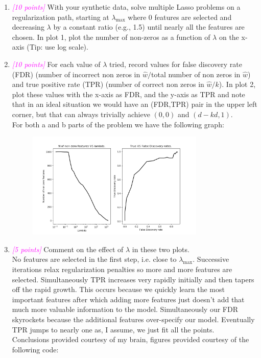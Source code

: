 \documentclass{article}
\newcommand{\1}{\mathbf{1}}
\newcommand{\points}[1]{\small\textcolor{magenta}{\emph{[#1 points]}} \normalsize}
\begin{document}
\begin{enumerate}
    \item \points{10} With your synthetic data, solve multiple Lasso problems on a regularization path, starting at $\lambda_{\max}$ where 0 features are selected and decreasing $\lambda$ by a constant ratio (e.g., 1.5) until nearly all the features are chosen. In plot 1, plot the number of non-zeros as a function of $\lambda$ on the x-axis (Tip: use log scale).
    \item \points{10} For each value of $\lambda$ tried, record values for false discovery rate (FDR) (number of incorrect non zeros in $\widehat w/$total number of non zeros in $\widehat w$) and true positive rate (TPR) (number of correct non zeros in $\widehat w/k$). In plot 2, plot these values with the x-axis as FDR, and the y-axis as TPR and note that in an ideal situation we would have an (FDR,TPR) pair in the upper left corner, but that can always trivially achieve $(0,0)$ and $(d-kd,1)$. \\
    For both a and b parts of the problem we have the following graph:
    \begin{figure}[h!]
        \centering
        \includegraphics[width=0.8\textwidth]{HW2/HW2_plots/CoordinateDescent.png}
    \end{figure}
    
    \newpage
    \item \points{5} Comment on the effect of $\lambda$ in these two plots. \\
    No features are selected in the first step, i.e. close to $\lambda_{\max}$. Successive iterations relax regularization penalties so more and more features are selected. Simultaneously TPR increases very rapidly initially and then tapers off the rapid growth. This occurs because we quickly learn the most important features after which adding more features just doesn't add that much more valuable information to the model. Simultaneously our FDR skyrockets because the additional features over-specify our model. Eventually TPR jumps to nearly one as, I assume, we just fit all the points. \\

Conclusions provided courtesy of my brain, figures provided courtesy of the following code:
    


\end{enumerate}
\end{document}
